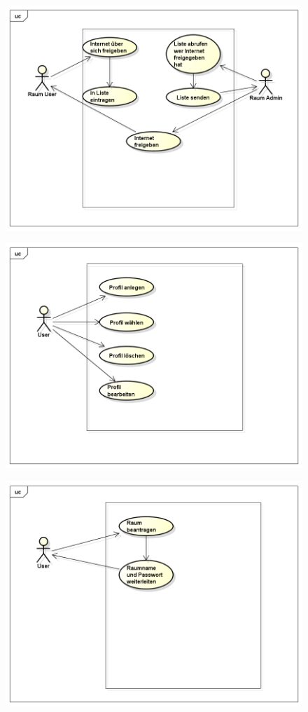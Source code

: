 \documentclass[a4paper,12pt]{scrreprt}
\begin{document}
	\begin{figure}[h]
		\centering
		\includegraphics[width=0.9\linewidth]{VPN_Internet_freigeben}
		\caption{}
		\label{fig:VPN_Internet_freigeben}
	\end{figure}
	\begin{figure}[h]
		\centering
		\includegraphics[width=0.9\linewidth]{VPN_Profilemanager}
		\caption{}
		\label{fig:VPN_Profilemanager}
	\end{figure}
	\begin{figure}[h]
		\centering
		\includegraphics[width=0.9\linewidth]{VPN_Raum_Beantragen}
		\caption{}
		\label{fig:VPN_Raum_Beantragen}
	\end{figure}
\end{document}
